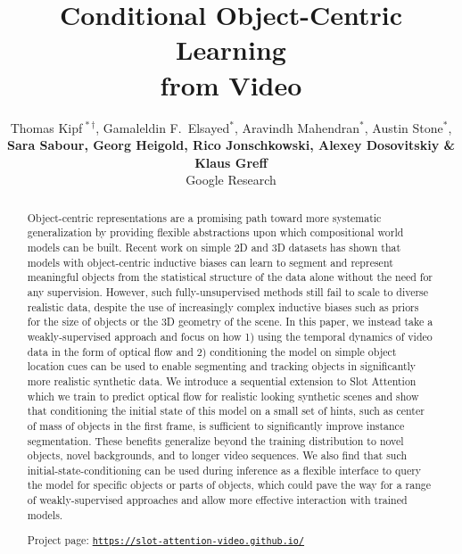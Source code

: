 \documentclass{article}
\title{Conditional Object-Centric Learning\\from Video}
\author{Thomas Kipf$^{\,*\dagger}$, Gamaleldin F.~Elsayed$^*$, Aravindh Mahendran$^*$, Austin Stone$^*$,\\\textbf{Sara Sabour, Georg Heigold, Rico Jonschkowski, Alexey Dosovitskiy \& Klaus Greff}\\
Google Research}
\begin{document}
\maketitle

\begin{abstract}
Object-centric representations are a promising path toward more systematic generalization by providing flexible abstractions upon which compositional world models can be built. Recent work on simple 2D and 3D datasets has shown that models with object-centric inductive biases can learn to segment and represent meaningful objects from the statistical structure of the data alone without the need for any supervision. However, such fully-unsupervised methods still fail to scale to diverse realistic data, despite the use of increasingly complex inductive biases such as priors for the size of objects or the 3D geometry of the scene. In this paper, we instead take a weakly-supervised approach and focus on how 1) using the temporal dynamics of video data in the form of optical flow and 2) conditioning the model on simple object location cues can be used to enable segmenting and tracking objects in significantly more realistic synthetic data. We introduce a sequential extension to Slot Attention which we train to predict optical flow for realistic looking synthetic scenes and show that conditioning the initial state of this model on a small set of hints, such as center of mass of objects in the first frame, is sufficient to significantly improve instance segmentation. These benefits generalize beyond the training distribution to novel objects, novel backgrounds, and to longer video sequences. We also find that such initial-state-conditioning can be used during inference as a flexible interface to query the model for specific objects or parts of objects, which could pave the way for a range of weakly-supervised approaches and allow more effective interaction with trained models.

Project page: \href{https://slot-attention-video.github.io/}{\small\texttt{https://slot-attention-video.github.io/}}


\end{abstract}
\end{document}
